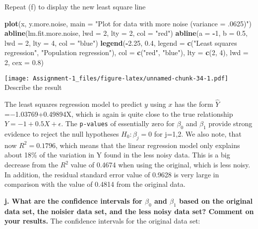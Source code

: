\documentclass[
]{article}
\newenvironment{Shaded}{\begin{snugshade}}{\end{snugshade}}
\newcommand{\AttributeTok}[1]{\textcolor[rgb]{0.13,0.29,0.53}{#1}}
\newcommand{\DecValTok}[1]{\textcolor[rgb]{0.00,0.00,0.81}{#1}}
\newcommand{\FloatTok}[1]{\textcolor[rgb]{0.00,0.00,0.81}{#1}}
\newcommand{\FunctionTok}[1]{\textcolor[rgb]{0.13,0.29,0.53}{\textbf{#1}}}
\newcommand{\NormalTok}[1]{#1}
\newcommand{\SpecialCharTok}[1]{\textcolor[rgb]{0.81,0.36,0.00}{\textbf{#1}}}
\newcommand{\StringTok}[1]{\textcolor[rgb]{0.31,0.60,0.02}{#1}}
\begin{document}
Repeat (f) to display the new least square line

\begin{Shaded}
\begin{Highlighting}[]
\FunctionTok{plot}\NormalTok{(x, y.more.noise, }\AttributeTok{main =} \StringTok{"Plot for data with more noise (variance = .0625)"}\NormalTok{)}
\FunctionTok{abline}\NormalTok{(lm.fit.more.noise, }\AttributeTok{lwd =} \DecValTok{2}\NormalTok{, }\AttributeTok{lty =} \DecValTok{2}\NormalTok{, }\AttributeTok{col =} \StringTok{"red"}\NormalTok{)}
\FunctionTok{abline}\NormalTok{(}\AttributeTok{a =} \SpecialCharTok{{-}}\DecValTok{1}\NormalTok{, }\AttributeTok{b =} \FloatTok{0.5}\NormalTok{, }\AttributeTok{lwd =} \DecValTok{2}\NormalTok{, }\AttributeTok{lty =} \DecValTok{4}\NormalTok{, }\AttributeTok{col =} \StringTok{"blue"}\NormalTok{)}
\FunctionTok{legend}\NormalTok{(}\SpecialCharTok{{-}}\FloatTok{2.25}\NormalTok{, }\FloatTok{0.4}\NormalTok{, }\AttributeTok{legend =} \FunctionTok{c}\NormalTok{(}\StringTok{"Least squares regression"}\NormalTok{, }\StringTok{"Population regression"}\NormalTok{), }\AttributeTok{col =} \FunctionTok{c}\NormalTok{(}\StringTok{"red"}\NormalTok{, }\StringTok{"blue"}\NormalTok{), }
       \AttributeTok{lty =} \FunctionTok{c}\NormalTok{(}\DecValTok{2}\NormalTok{, }\DecValTok{4}\NormalTok{), }\AttributeTok{lwd =} \DecValTok{2}\NormalTok{, }\AttributeTok{cex =} \FloatTok{0.8}\NormalTok{)}
\end{Highlighting}
\end{Shaded}

\texttt{[image: Assignment-1\_files/figure-latex/unnamed-chunk-34-1.pdf]}
Describe the result

The least squares regression model to predict \(y\) using \(x\) has the
form \(\hat{Y}\)=−1.03769+0.49894X, which is again is quite close to the
true relationship \(Y=−1+0.5X+\epsilon\). The \texttt{p-values} of
essentially zero for \(\beta_0\) and \(\beta_1\) provide strong evidence
to reject the null hypotheses \(H_0:\beta_j=0\) for j=1,2. We also note,
that now \(R^2=0.1796\), which means that the linear regression model
only explains about 18\% of the variation in Y found in the less noisy
data. This is a big decrease from the \(R^2\) value of 0.4674 when using
the original, which is less noisy. In addition, the residual standard
error value of 0.9628 is very large in comparison with the value of
0.4814 from the original data.

\textbf{j. What are the confidence intervals for \(\beta_{0}\) and
\(\beta_{1}\) based on the original data set, the noisier data set, and
the less noisy data set? Comment on your results.} The confidence
intervals for the original data set:
\end{document}
